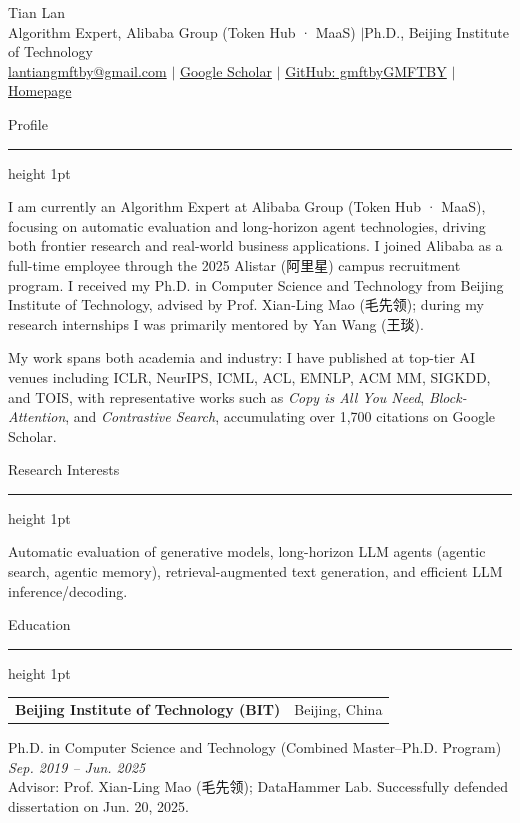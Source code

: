 \documentclass[10.5pt]{article}
\makeatletter
\newcommand{\cvsection}[1]{%
  \vspace{10pt}
  {\color{accent}\headingfont\Large #1}\par
  \vspace{2pt}
  {\color{accent}\hrule height 1pt}
  \vspace{6pt}
}
\newcommand{\entry}[3]{%
  \noindent\begin{tabularx}{\textwidth}{@{}X r@{}}
    \textbf{#1} & {\color{muted}\small #2} \\
  \end{tabularx}
  #3
}
\makeatother
\begin{document}
\begin{center}
  {\headingfont\fontsize{24}{28}\selectfont Tian Lan} \\[4pt]
  {\color{muted} Algorithm Expert, Alibaba Group (Token Hub · MaaS) \quad$\vert$\quad Ph.D., Beijing Institute of Technology}\\[4pt]
  {\small
    \href{mailto:lantiangmftby@gmail.com}{lantiangmftby@gmail.com} \quad$\vert$\quad
    \href{https://scholar.google.com/citations?user=B0W47gsAAAAJ&hl=zh-CN}{Google Scholar} \quad$\vert$\quad
    \href{https://github.com/gmftbyGMFTBY}{GitHub: gmftbyGMFTBY} \quad$\vert$\quad
    \href{https://lantiangmftby.github.io/}{Homepage}
  }
\end{center}

\cvsection{Profile}
I am currently an Algorithm Expert at Alibaba Group (Token Hub · MaaS), focusing on automatic evaluation and long-horizon agent technologies, driving both frontier research and real-world business applications. I joined Alibaba as a full-time employee through the 2025 Alistar ({\cjkfont 阿里星}) campus recruitment program. I received my Ph.D. in Computer Science and Technology from Beijing Institute of Technology, advised by Prof. Xian-Ling Mao ({\cjkfont 毛先领}); during my research internships I was primarily mentored by Yan Wang ({\cjkfont 王琰}).

My work spans both academia and industry: I have published at top-tier AI venues including ICLR, NeurIPS, ICML, ACL, EMNLP, ACM MM, SIGKDD, and TOIS, with representative works such as \textit{Copy is All You Need}, \textit{Block-Attention}, and \textit{Contrastive Search}, accumulating over 1{,}700 citations on Google Scholar.

\cvsection{Research Interests}
Automatic evaluation of generative models, long-horizon LLM agents (agentic search, agentic memory), retrieval-augmented text generation, and efficient LLM inference/decoding.

\cvsection{Education}

\entry{Beijing Institute of Technology (BIT)}{Beijing, China}{}
Ph.D. in Computer Science and Technology (Combined Master--Ph.D. Program) \hfill \textit{Sep. 2019 -- Jun. 2025}\\
Advisor: Prof. Xian-Ling Mao ({\cjkfont 毛先领}); DataHammer Lab. Successfully defended dissertation on Jun. 20, 2025.
\vspace{4pt}
\end{document}
